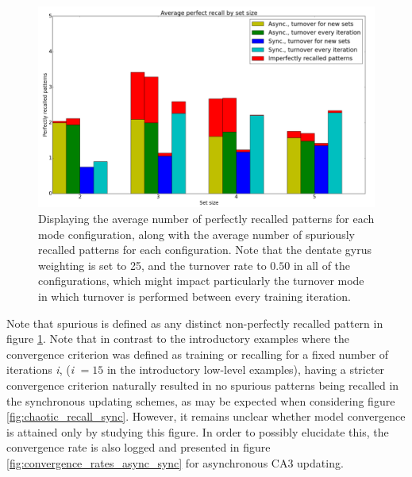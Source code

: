 
\begin{figure}
    \centering
    \includegraphics[width=12cm]{fig/cut_prr_with_spurious_reset_every_experiment}
    \caption{Displaying the average number of perfectly recalled patterns for each mode configuration, along with the average number of spuriously recalled patterns for each configuration. Note that the dentate gyrus weighting is set to 25, and the turnover rate to $0.50$ in all of the configurations, which might impact particularly the turnover mode in which turnover is performed between every training iteration.}
    \label{fig:avg_perfect_recall_rates_with_spurious_bars}
\end{figure}

Note that spurious is defined as any distinct non-perfectly recalled pattern in figure \ref{fig:avg_perfect_recall_rates_with_spurious_bars}. Note that in contrast to the introductory examples where the convergence criterion was defined as training or recalling for a fixed number of iterations \textit{i}, (\textit{i} $=15$ in the introductory low-level examples), having a stricter convergence criterion naturally resulted in no spurious patterns being recalled in the synchronous updating schemes, as may be expected when considering figure \ref{fig:chaotic_recall_sync}. However, it remains unclear whether model convergence is attained only by studying this figure. In order to possibly elucidate this, the convergence rate is also logged and presented in figure \ref{fig:convergence_rates_async_sync} for asynchronous CA3 updating.


